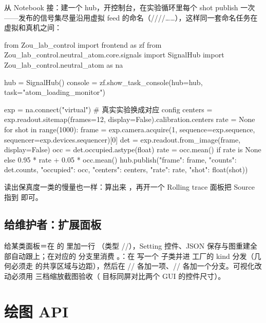 \documentclass[11pt,oneside,openany]{book}
\begin{document}
从 Notebook 接：建一个 hub，开控制台，在实验循环里每个 shot publish 一次——发布的信号集尽量沿用虚拟 feed 的命名（////……），这样同一套命名任务在虚拟和真机之间：
\begin{codeblock}[Python]
from Zou_lab_control import frontend as zf
from Zou_lab_control.neutral_atom.core.signals import SignalHub
import Zou_lab_control.neutral_atom as na

hub = SignalHub()
console = zf.show_task_console(hub=hub, task="atom_loading_monitor")

exp = na.connect("virtual")            # 真实实验换成对应 config
centers = exp.readout.sitemap(frames=12, display=False).calibration.centers
rate = None
for shot in range(1000):
    frame = exp.camera.acquire(1, sequence=exp.sequence,
                               sequencer=exp.devices.sequencer)[0]
    det = exp.readout.from_image(frame, display=False)
    occ = det.occupied.astype(float)
    rate = occ.mean() if rate is None else 0.95 * rate + 0.05 * occ.mean()
    hub.publish({"frame": frame, "counts": det.counts, "occupied": occ,
                 "centers": centers, "rate": rate, "shot": float(shot)})
\end{codeblock}
读出保真度一类的慢量也一样：算出来 ，再开一个 Rolling trace 面板把 Source 指到  即可。

\section{给维护者：扩展面板}
给某类面板＝在  的  里加一行 （类型 //），Setting 控件、JSON 保存与图重建全部自动跟上；在对应的  分支里消费 。：在  写一个  子类并进  工厂的 kind 分发（几何必须走  的共享区域与边距），然后在 // 各加一项、// 各加一个分支。可视化改动必须用  三档缩放截图验收（ 目标同屏对比两个 GUI 的控件尺寸）。


\chapter{绘图 API}
\end{document}
